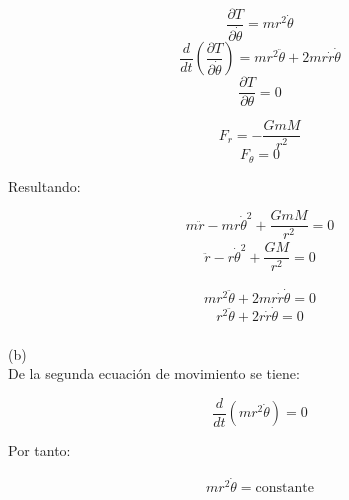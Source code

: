 \documentclass[letter,11pt]{article}
\begin{document}
\begin{equation*}
    \frac{\partial T}{\partial \dot{\theta}}=mr^2\dot{\theta}
\end{equation*}
\begin{equation*}
    \frac{d}{dt}\left(
        \frac{\partial T}{\partial \dot{\theta}}
    \right)=mr^2\ddot{\theta}+2mr\dot{r}\dot{\theta}
\end{equation*}
\begin{equation*}
    \frac{\partial T}{\partial \theta}=0
\end{equation*}

\begin{equation*}
    F_r=-\frac{GmM}{r^2}
\end{equation*}
\begin{equation*}
    F_{\theta}=0
\end{equation*}

Resultando:

\begin{equation*}
    m\ddot{r}-mr\dot{\theta}^2+\frac{GmM}{r^2}=0
\end{equation*}
\begin{equation}
\boxed{\begin{array}{l}
    \ddot{r}-r\dot{\theta}^2+\dfrac{GM}{r^2}=0
\end{array}}
\label{ec02}
\end{equation}

\begin{equation*}
    mr^2\ddot{\theta}+2mr\dot{r}\dot{\theta}=0
\end{equation*}
\begin{equation}
\boxed{\begin{array}{l}
    r^2\ddot{\theta}+2r\dot{r}\dot{\theta}=0
\end{array}}
\label{ec03}
\end{equation}
\\

(b) \\

De la segunda ecuación de movimiento se tiene:

\begin{equation}
    \frac{d}{dt}(mr^2\dot{\theta})=0
    \label{ec04}
\end{equation}

Por tanto:

\begin{equation*}
\boxed{\begin{array}{l}
    mr^2\dot{\theta}=\text{constante}
\end{array}}
\end{equation*}
\end{document}
